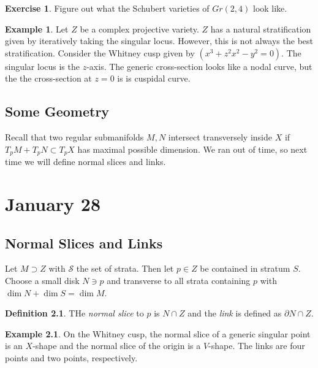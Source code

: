 \documentclass[leqno, openany]{memoir}
\theoremstyle{definition}
\newtheorem{defn}[thm]{Definition}
\newtheorem{exm}[thm]{Example}
\newtheorem{exer}[thm]{Exercise}
\theoremstyle{remark}
\theoremstyle{plain}
\theoremstyle{definition}
\theoremstyle{remark}
\newcommand{\mc}[1]{\mathcal{#1}}
\begin{document}
\begin{exer}
    Figure out what the Schubert varieties of $Gr(2,4)$ look like.
\end{exer}

\begin{exm}
    Let $Z$ be a complex projective variety. $Z$ has a natural stratification given by iteratively taking the singular locus. However, this is not always the best stratification. Consider the Whitney cusp given by $(x^3+z^2x^2-y^2 = 0)$. The singular locus is the $z$-axis. The generic cross-section looks like a nodal curve, but the the cross-section at $z=0$ is is cuspidal curve. 
\end{exm}

\section{Some Geometry}%
\label{sec:some_geometry}

Recall that two regular submanifolds $M,N$ intersect transversely inside $X$ if $T_p M + T_p N \subset T_p X$ has maximal possible dimension. We ran out of time, so next time we will define normal slices and links.

\chapter{January 28}%
\label{cha:january_28}

\section{Normal Slices and Links}%
\label{sec:normal_slices_and_links}

Let $M \supset Z$ with $\mc{S}$ the set of strata. Then let $p \in Z$ be contained in stratum $S$. Choose a small disk $N \ni p$ and transverse to all strata containing $p$ with $\dim N + \dim S = \dim M$.

\begin{defn}
    THe \textit{normal slice} to $p$ is $N \cap Z$ and the \textit{link} is defined as $\partial N \cap Z$.
\end{defn}

\begin{exm}
    On the Whitney cusp, the normal slice of a generic singular point is an $X$-shape and the normal slice of the origin is a $V$-shape. The links are four points and two points, respectively.
\end{exm}
\end{document}
